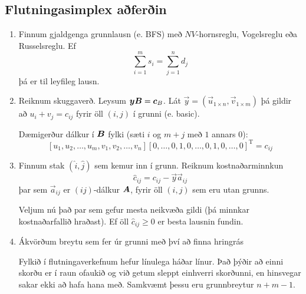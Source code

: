 \subsection{Flutningasimplex aðferðin}
\begin{enumerate}
\item Finnum gjaldgenga grunnlausn (e. BFS) með $NV$-hornsreglu,
  Vogels\-reglu eða Russelsreglu. Ef  $$\sum_{i=1}^ms_i=\sum_{j=1}^nd_j$$ þá er til leyfileg lausn.
\item Reiknum skuggaverð. Leysum
  ${\mbox{\boldmath$y$}}{\mbox{\boldmath$B$}} = {\mbox{\boldmath$c$}}_B$. Lát $\vec{y} = (\vec{u}_{1\times
  n}, \vec{v}_{1\times m})$ þá gildir að $u_i+v_j=c_{ij}$ fyrir
  öll $(i,j)$ í grunni (e. basic). 
 \begin{aths} Dæmigerður dálkur í ${\mbox{\boldmath$B$}}$ fylki  (sæti $i$ og $m+j$ með $1$ annars $0$): {\footnotesize 
$$[ u_1, u_2, \ldots, u_m, v_1, v_2, \ldots, v_n] [0, \ldots, 0, 1, 0, \ldots, 0, 1, 0, \ldots, 0]^{\text{T}} = c_{ij}$$}  
 \end{aths}

\item Finnum stak $(\hat{i},\hat{j})$ sem kemur inn í grunn. Reiknum kostnaðarminnkun
  $$\hat{c}_{ij}=c_{ij}-\vec{y}\vec{a}_{ij}$$
  þar sem $\vec{a}_{ij}$ er $(ij)$-dálkur ${\mbox{\boldmath$A$}}$, %
  fyrir öll $(i,j)$ sem eru utan grunns. 

  Veljum nú það par sem gefur mesta neikvæða gildi  (þá minnkar kostn\-aðar\-fallið hraðast). Ef öll $\hat{c}_{ij}\ge 0$ er besta lausnin fundin.

\item Ákvörðum breytu sem fer úr grunni með því að finna hringrás
\begin{aths}Fylkið í flutningaverkefnum hefur línulega háðar línur. Það þýðir að einni skorðu er í raun 
ofaukið og við getum sleppt einhverri skorðunni, en hinsvegar sakar ekki að hafa hana með. Samkvæmt þessu eru grunnbreytur $n + m - 1$. %
\end{aths}


\end{enumerate}

